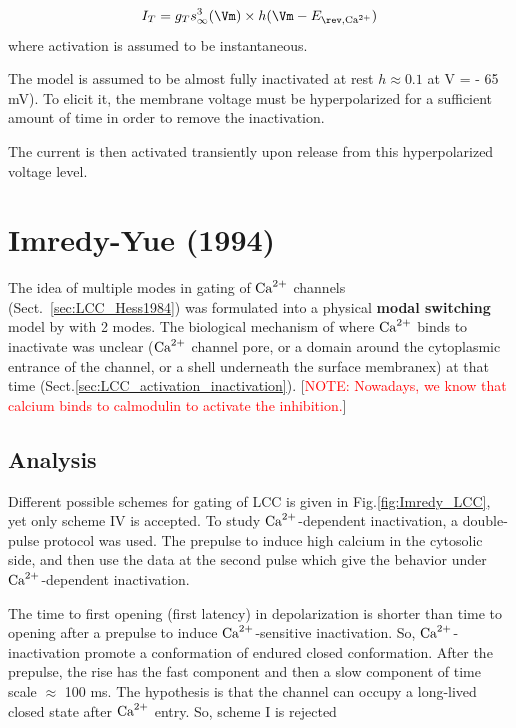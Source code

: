 \begin{equation}
I_T = g_T s_\infty^3(\Vm) \times h (\Vm-E_{\rev,\Ca})
\end{equation}
where activation is assumed to be instantaneous.

The model is assumed to be almost fully inactivated at rest $h \approx 0.1$ at V
= - 65 mV).
To elicit it, the membrane voltage must be hyperpolarized for a sufficient
amount of time in order to remove the inactivation.

The current is then activated transiently upon release from this hyperpolarized
voltage level.




\section{Imredy-Yue (1994)}
\label{sec:LCC_Imredy1994}

The idea of multiple modes in gating of ${\text{Ca}^{2+}}$ channels
(Sect.~\ref{sec:LCC_Hess1984}) was formulated into a physical {\bf modal
switching} model by \citep{imredy1994mcs} with 2 modes. The biological mechanism
of where ${\text{Ca}^{2+}}$ binds to inactivate was unclear (${\text{Ca}^{2+}}$ channel pore, or a domain
around the cytoplasmic entrance of the channel, or a shell underneath the
surface membranex) at that time (Sect.\ref{sec:LCC_activation_inactivation}).
[\textcolor{red}{NOTE: Nowadays, we know that calcium binds to calmodulin to
activate the inhibition.}]

\subsection{Analysis}

Different possible schemes for gating of LCC is given in
Fig.\ref{fig:Imredy_LCC}, yet only scheme IV is accepted. To study
${\text{Ca}^{2+}}$-dependent inactivation, a double-pulse protocol was used. The prepulse to
induce high calcium in the cytosolic side, and then use the data at the second
pulse which give the behavior under ${\text{Ca}^{2+}}$-dependent inactivation.

The time to first opening (first latency) in depolarization is shorter than time
to opening after a prepulse to induce ${\text{Ca}^{2+}}$-sensitive inactivation. So,
${\text{Ca}^{2+}}$-inactivation promote a conformation of endured closed conformation. After
the prepulse, the rise has the fast component and then a slow component of time
scale $\approx$ 100 ms. The hypothesis is that the channel can occupy a
long-lived closed state after ${\text{Ca}^{2+}}$ entry. So, scheme I is rejected
 
